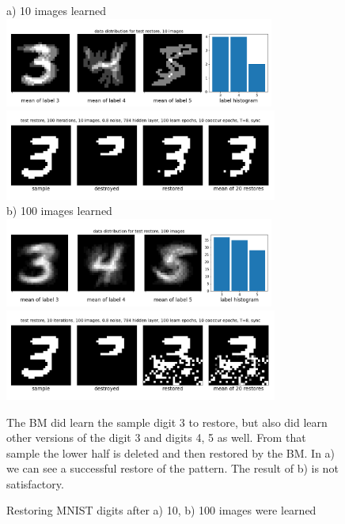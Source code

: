 \documentclass[12pt,twoside]{article}
\theoremstyle{plain}
\theoremstyle{definition}
\theoremstyle{remark}
\begin{document}
\begin{figure}[t!]
	\begin{center}
	a) 10 images learned
	\includegraphics[trim={0.2cm 0.5cm 0cm 1.7cm},clip,width=0.79\textwidth]{src/data_distribution_10_images}
	\includegraphics[trim={0cm 1.0cm 0cm 0cm},clip,width=0.8\textwidth]{src/test_restore_10_images}\\
	b) 100 images learned
	\includegraphics[trim={0.2cm 0.5cm 0cm 1.7cm},clip,width=0.79\textwidth]{src/data_distribution_100_images}
	\includegraphics[trim={0cm 1.0cm 0cm 0cm},clip,width=0.8\textwidth]{src/test_restore_100_images}
	\end{center}
	\caption{Restoring MNIST digits after a) 10, b) 100 images were learned}\label{fig:test_restore}
	\footnotesize The BM did learn the sample digit 3 to restore, but also did learn other versions of the digit 3 and digits 4, 5 as well. From that sample the lower half is deleted and then restored by the BM. In a) we can see a successful restore of the pattern. The result of b) is not satisfactory.
\end{figure}
\end{document}

